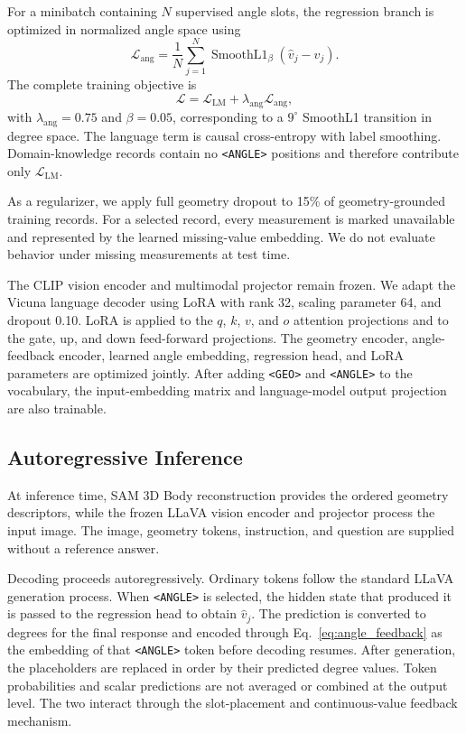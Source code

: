\documentclass[conference]{IEEEtran}
\begin{document}
For a minibatch containing $N$ supervised angle slots, the regression branch is optimized in normalized angle space using
\begin{equation}
    \mathcal{L}_{\mathrm{ang}}
    =\frac{1}{N}\sum_{j=1}^{N}
    \operatorname{SmoothL1}_{\beta}
    \!\left(\widehat{v}_j-v_j\right).
    \label{eq:regression_loss}
\end{equation}
The complete training objective is
\begin{equation}
    \mathcal{L}
    =\mathcal{L}_{\mathrm{LM}}
    +\lambda_{\mathrm{ang}}\mathcal{L}_{\mathrm{ang}},
    \label{eq:total_loss}
\end{equation}
with $\lambda_{\mathrm{ang}}=0.75$ and $\beta=0.05$, corresponding to a $9^\circ$ SmoothL1 transition in degree space.
The language term is causal cross-entropy with label smoothing.
Domain-knowledge records contain no \texttt{<ANGLE>} positions and therefore contribute only $\mathcal{L}_{\mathrm{LM}}$.

As a regularizer, we apply full geometry dropout to 15\% of geometry-grounded training records.
For a selected record, every measurement is marked unavailable and represented by the learned missing-value embedding.
We do not evaluate behavior under missing measurements at test time.

The CLIP vision encoder and multimodal projector remain frozen.
We adapt the Vicuna language decoder using LoRA with rank 32, scaling parameter 64, and dropout 0.10.
LoRA is applied to the $q$, $k$, $v$, and $o$ attention projections and to the gate, up, and down feed-forward projections.
The geometry encoder, angle-feedback encoder, learned angle embedding, regression head, and LoRA parameters are optimized jointly.
After adding \texttt{<GEO>} and \texttt{<ANGLE>} to the vocabulary, the input-embedding matrix and language-model output projection are also trainable.

\subsection{Autoregressive Inference}
\label{sec:inference}

At inference time, SAM 3D Body reconstruction provides the ordered geometry descriptors, while the frozen LLaVA vision encoder and projector process the input image.
The image, geometry tokens, instruction, and question are supplied without a reference answer.

Decoding proceeds autoregressively.
Ordinary tokens follow the standard LLaVA generation process.
When \texttt{<ANGLE>} is selected, the hidden state that produced it is passed to the regression head to obtain $\widehat{v}_j$.
The prediction is converted to degrees for the final response and encoded through Eq.~\eqref{eq:angle_feedback} as the embedding of that \texttt{<ANGLE>} token before decoding resumes.
After generation, the placeholders are replaced in order by their predicted degree values.
Token probabilities and scalar predictions are not averaged or combined at the output level.
The two interact through the slot-placement and continuous-value feedback mechanism.
\end{document}
